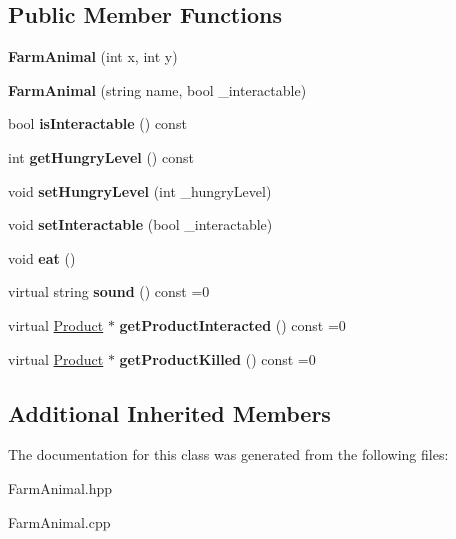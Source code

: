\subsection*{Public Member Functions}
\begin{DoxyCompactItemize}
\item 
\mbox{\label{class_farm_animal_adea13b232d5f3967a473e2e062d33ee8}} 
{\bfseries Farm\+Animal} (int x, int y)
\item 
\mbox{\label{class_farm_animal_a9074f701149c6510ecdb7b30fca5a098}} 
{\bfseries Farm\+Animal} (string name, bool \+\_\+interactable)
\item 
\mbox{\label{class_farm_animal_ab3bbdd721661612905812389b2379b88}} 
bool {\bfseries is\+Interactable} () const
\item 
\mbox{\label{class_farm_animal_aa00afec2fda5a9b844af6ad5430a57b5}} 
int {\bfseries get\+Hungry\+Level} () const
\item 
\mbox{\label{class_farm_animal_ac72800f8a9026d411de991b40803bcc8}} 
void {\bfseries set\+Hungry\+Level} (int \+\_\+hungry\+Level)
\item 
\mbox{\label{class_farm_animal_a6b7ceb3ab8331c459cccd1f401bad0e0}} 
void {\bfseries set\+Interactable} (bool \+\_\+interactable)
\item 
\mbox{\label{class_farm_animal_ad805436da6500547986a78f986f85904}} 
void {\bfseries eat} ()
\item 
\mbox{\label{class_farm_animal_acfce9920341361cb864ff74b62d6d535}} 
virtual string {\bfseries sound} () const =0
\item 
\mbox{\label{class_farm_animal_a7055842b3664941529ffcc1d59c37cb2}} 
virtual \mbox{\hyperlink{class_product}{Product}} $\ast$ {\bfseries get\+Product\+Interacted} () const =0
\item 
\mbox{\label{class_farm_animal_a97987dbe9c68b50e16ab19ac4eb736a6}} 
virtual \mbox{\hyperlink{class_product}{Product}} $\ast$ {\bfseries get\+Product\+Killed} () const =0
\end{DoxyCompactItemize}
\subsection*{Additional Inherited Members}


The documentation for this class was generated from the following files\+:\begin{DoxyCompactItemize}
\item 
Farm\+Animal.\+hpp\item 
Farm\+Animal.\+cpp\end{DoxyCompactItemize}
